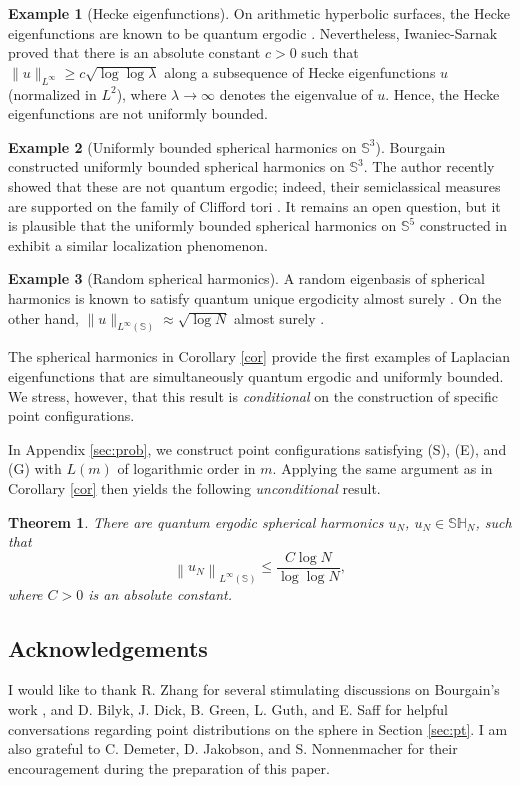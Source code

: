 \documentclass[12pt,reqno]{amsart}
\newcommand{\Sb}{\mathbb{S}}
\newcommand{\SH}{\mathbb{SH}}
\theoremstyle{plain}
\newtheorem{thm}{Theorem}[section]
\theoremstyle{definition}
\newtheorem*{ex}{Example}
\theoremstyle{remark}
\numberwithin{equation}{section}
\begin{document}
\begin{ex}[Hecke eigenfunctions]
On arithmetic hyperbolic surfaces, the Hecke eigenfunctions are known to be quantum ergodic \cite{BrLi, L}. Nevertheless, Iwaniec-Sarnak \cite[Theorem 0.1(b)]{IS} proved that there is an absolute constant $c>0$ such that $\|u\|_{L^\infty}\ge c\sqrt{\log\log\lambda}$ along a subsequence of Hecke eigenfunctions $u$ (normalized in $L^2$), where $\lambda\to\infty$ denotes the eigenvalue of $u$. Hence, the Hecke eigenfunctions are not uniformly bounded.
\end{ex}

\begin{ex}[Uniformly bounded spherical harmonics on $\Sb^3$]
Bourgain \cite{Bo1} constructed uniformly bounded spherical harmonics on $\Sb^3$. The author recently showed that these are not quantum ergodic; indeed, their semiclassical measures are supported on the family of Clifford tori \cite{Ha2}. It remains an open question, but it is plausible that the uniformly bounded spherical harmonics on $\Sb^5$ constructed in \cite{Bo2} exhibit a similar localization phenomenon.
\end{ex}

\begin{ex}[Random spherical harmonics]
A random eigenbasis of spherical harmonics is known to satisfy quantum unique ergodicity almost surely \cite{Ze2, V, BuLe}. On the other hand, $\|u\|_{L^\infty(\Sb)}\approx\sqrt{\log N}$ almost surely \cite{V, BuLe}.
\end{ex}

The spherical harmonics in Corollary \ref{cor} provide the first examples of Laplacian eigenfunctions that are simultaneously quantum ergodic and uniformly bounded. We stress, however, that this result is \textit{conditional} on the construction of specific point configurations.

In Appendix \ref{sec:prob}, we construct point configurations satisfying (S), (E), and (G) with $L(m)$ of logarithmic order in $m$. Applying the same argument as in Corollary \ref{cor} then yields the following \textit{unconditional} result.

\begin{thm}\label{thm:log}
There are quantum ergodic spherical harmonics $u_N$, $u_N\in\SH_N$, such that
$$\left\|u_N\right\|_{L^\infty(\Sb)}\le\frac{C\log N}{\log\log N},$$
where $C>0$ is an absolute constant.
\end{thm}

\subsection*{Acknowledgements}
I would like to thank R. Zhang for several stimulating discussions on Bourgain’s work \cite{Bo1, Bo2}, and D. Bilyk, J. Dick, B. Green, L. Guth, and E. Saff for helpful conversations regarding point distributions on the sphere in Section \ref{sec:pt}. I am also grateful to C. Demeter, D. Jakobson, and S. Nonnenmacher for their encouragement during the preparation of this paper. 
\end{document}
